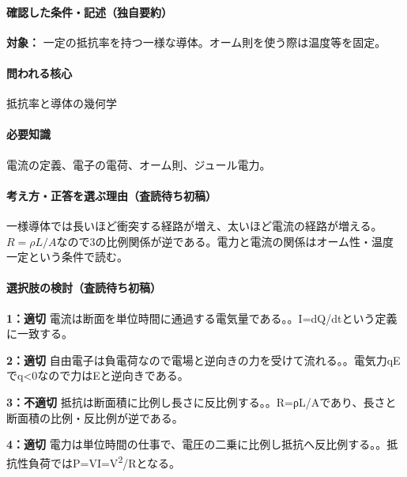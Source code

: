 \paragraph{確認した条件・記述（独自要約）}\mbox{}\par

\noindent\textbf{対象：} 一定の抵抗率を持つ一様な導体。オーム則を使う際は温度等を固定。\par

\paragraph{問われる核心} 抵抗率と導体の幾何学

\paragraph{必要知識} 電流の定義、電子の電荷、オーム則、ジュール電力。

\paragraph{考え方・正答を選ぶ理由（査読待ち初稿）} 一様導体では長いほど衝突する経路が増え、太いほど電流の経路が増える。\(R=\rho L/A\)なので3の比例関係が逆である。電力と電流の関係はオーム性・温度一定という条件で読む。

\paragraph{選択肢の検討（査読待ち初稿）}\mbox{}\par

\noindent\textbf{1：適切} 電流は断面を単位時間に通過する電気量である。。I=\allowbreak{}dQ/dtという定義に一致する。\par

\noindent\textbf{2：適切} 自由電子は負電荷なので電場と逆向きの力を受けて流れる。。電気力qEでq<0なので力はEと逆向きである。\par

\noindent\textbf{3：不適切} 抵抗は断面積に比例し長さに反比例する。。R=ρL/Aであり、長さと断面積の比例・反比例が逆である。\par

\noindent\textbf{4：適切} 電力は単位時間の仕事で、電圧の二乗に比例し抵抗へ反比例する。。抵抗性負荷ではP=\allowbreak{}VI=\allowbreak{}V\textsuperscript{2}/Rとなる。\par

